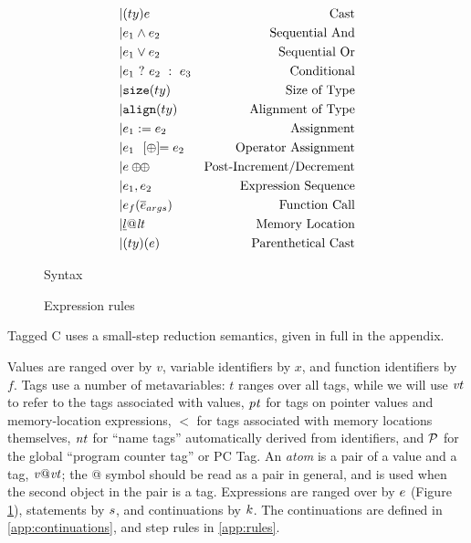 \documentclass[acmsmall,review,anonymous]{acmart}\settopmatter{printfolios=true,printccs=false,printacmref=false}
\begin{document}
\begin{figure}
\begin{subfigure}[t]{0.69\textwidth}
\[\begin{aligned}
    | & (ty) e & \textnormal{Cast} \\
    | & e_1 \land e_2 & \textnormal{Sequential And} \\
    | & e_1 \lor e_2 & \textnormal{Sequential Or} \\
    | & e_1 ~ ? ~ e_2 ~ : ~ e_3 & \textnormal{Conditional} \\
    | & \mathtt{size}(ty) & \textnormal{Size of Type} \\
    | & \mathtt{align}(ty) & \textnormal{Alignment of Type} \\
    | & e_1 := e_2 & \textnormal{Assignment} \\
    | & e_1 ~~ [\oplus]\!\!= e_2 & \textnormal{Operator Assignment} \\
    | & e \oplus\!\!\oplus & \textnormal{Post-Increment/Decrement} \\
    | & e_1, e_2 & \textnormal{Expression Sequence} \\
    | & e_f(\overline{e}_{args}) & \textnormal{Function Call} \\
    | & \underline{l}@\mathit{lt} & \textnormal{Memory Location} \\
    | & (ty) (e) & \textnormal{Parenthetical Cast} \\
    \end{aligned}\]
  \end{subfigure}
  \caption{Syntax}
  \label{fig:syntax}
\end{figure}

\begin{figure}
  \allocstep
  \valofstep
  \assignopstep
  \postincstep
  \assignstep
  \varstep
  \unopstep
  \binopstep
  
  \caption{Expression rules}
  \label{fig:exprstep}
\end{figure}

Tagged C uses a small-step reduction semantics, given in full in the appendix.

Values are ranged over by \(v\), variable identifiers by \(x\), and function identifiers by \(f\).
Tags use a number of metavariables: \(t\) ranges over all tags, while we will use
\(\mathit{vt}\) to refer to the tags associated with values, \(\mathit{pt}\) for tags on pointer values
and memory-location expressions, \(\lt\) for tags associated with memory locations themselves,
\(\mathit{nt}\) for ``name tags'' automatically derived from identifiers, and \(\mathcal{P}\) for the
global ``program counter tag'' or PC Tag.
An {\it atom} is a pair of a value and a tag, \(\mathit{v} @ \mathit{vt}\); the @ symbol should be read
as a pair in general, and is used when the second object in the pair is a tag.
Expressions are ranged over by \(e\) (Figure \ref{fig:syntax}),
statements by \(s\), and continuations by \(k\).
The continuations are defined in \cref{app:continuations}, and step rules in \cref{app:rules}.
\end{document}
